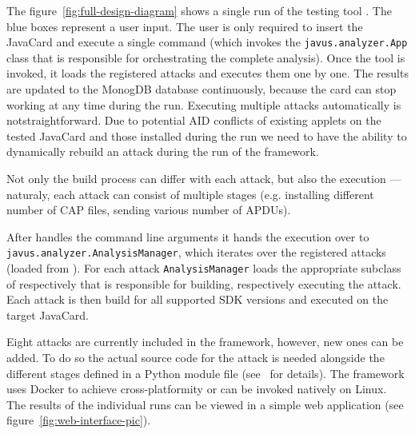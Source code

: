 \documentclass{../llncs/llncs}
\begin{document}
    The figure~\ref{fig:full-design-diagram} shows a single run of the testing tool \javus. The blue boxes represent a user input. The user is only required to insert the JavaCard and execute a single command \javusrun (which invokes the \texttt{javus.analyzer.App} class that is responsible for orchestrating the complete analysis). Once the tool is invoked, it loads the registered attacks and executes them one by one. The results are updated to the MonogDB database continuously, because the card can stop working at any time during the run.
    Executing multiple attacks automatically is not\linebreak straightforward.
    Due to potential AID conflicts of existing applets on the tested JavaCard and those installed during the run we need to have the ability to dynamically rebuild an attack during the run of the framework.

    Not only the build process can differ with each attack, but also the execution --- naturaly, each attack can consist of multiple stages (e.g. installing different number of CAP files, sending various number of APDUs).

    After \shortappclass handles the command line arguments it hands the execution over to \texttt{javus.analyzer.AnalysisManager}, which iterates over the registered attacks (loaded from ). For each attack \texttt{AnalysisManager} loads the appropriate subclass of \shortbuilderclass respectively \shortexecutorclass that is responsible for building, respectively executing the attack. Each attack is then build for all supported SDK versions and executed on the target JavaCard.

    Eight attacks are currently included in the framework, however, new ones can be added. To do so the actual source code for the attack is needed alongside the different stages defined in a Python module file (see~\cite{anon2020thesis} for details). The framework uses Docker to achieve cross-platformity or can be invoked natively on Linux. The results of the individual runs can be viewed in a simple web application (see figure~\ref{fig:web-interface-pic}).
\end{document}
